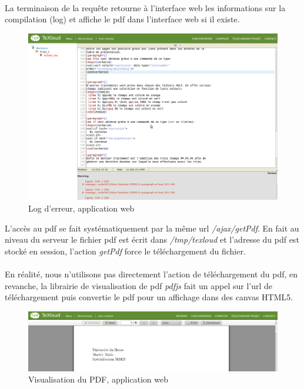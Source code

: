 \documentclass[a4paper,12pt]{article}
\begin{document}
\clearpage
\paragraph*{}
La terminaison de la requête retourne à l'interface web les informations sur la compilation (log) et affiche le pdf dans l'interface web si il existe.
\begin{figure}[!ht]
\begin{center}
  \includegraphics[width=1\textwidth]{./images/screenshot/CompileLog.png}
\end{center}
  \caption{Log d'erreur, application web}
  \label{compilation}
\end{figure}

L'accès au pdf se fait systématiquement par la même url \emph{/ajax/getPdf}.
En fait au niveau du serveur le fichier pdf est écrit dans \emph{/tmp/texloud} et l'adresse du pdf est stocké en session, l'action \emph{getPdf} force le téléchargement du fichier.

\clearpage
\paragraph*{}
En réalité, nous n'utilisons pas directement l'action de téléchargement du pdf, en revanche, la librairie de visualisation de pdf \emph{pdfjs} fait un appel sur l'url de téléchargement puis convertie le pdf pour un affichage dans des canvas HTML5.

\begin{figure}[!ht]
\begin{center}
  \includegraphics[width=1\textwidth]{./images/screenshot/pdfjs.png}
\end{center}
  \caption{Visualisation du PDF, application web}
  \label{compilation}
\end{figure}
\end{document}
